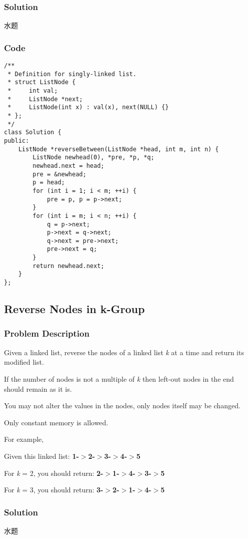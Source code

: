\documentclass[courier]{article}
\begin{document}
\begin{CJK*}{UTF8}{gkai}
\subsubsection*{Solution}
水题

\subsubsection*{Code}
\begin{lstlisting}
/**
 * Definition for singly-linked list.
 * struct ListNode {
 *     int val;
 *     ListNode *next;
 *     ListNode(int x) : val(x), next(NULL) {}
 * };
 */
class Solution {
public:
    ListNode *reverseBetween(ListNode *head, int m, int n) {
        ListNode newhead(0), *pre, *p, *q;
        newhead.next = head;
        pre = &newhead;
        p = head;
        for (int i = 1; i < m; ++i) {
            pre = p, p = p->next;
        }
        for (int i = m; i < n; ++i) {
            q = p->next;
            p->next = q->next;
            q->next = pre->next;
            pre->next = q;
        }
        return newhead.next;
    }
}; 
\end{lstlisting}


\subsection{ Reverse Nodes in k-Group }

\subsubsection*{Problem Description}
Given a linked list, reverse the nodes of a linked list \emph{k} at a time and return its modified list.

If the number of nodes is not a multiple of \emph{k} then left-out nodes in the end should remain as it is.

You may not alter the values in the nodes, only nodes itself may be changed.

Only constant memory is allowed.

For example,


Given this linked list: \textbf{1-$>$2-$>$3-$>$4-$>$5}

For \emph{k} = 2, you should return: \textbf{2-$>$1-$>$4-$>$3-$>$5}

For \emph{k} = 3, you should return: \textbf{3-$>$2-$>$1-$>$4-$>$5}



\subsubsection*{Solution}
水题


\end{CJK*}
\end{document}
